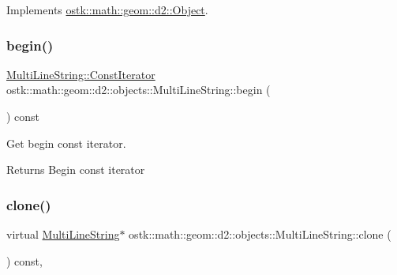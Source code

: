 Implements \hyperlink{classostk_1_1math_1_1geom_1_1d2_1_1_object_a959e50211d7a680f7f904bbb752d75c9}{ostk\+::math\+::geom\+::d2\+::\+Object}.

\mbox{\label{classostk_1_1math_1_1geom_1_1d2_1_1objects_1_1_multi_line_string_a9789bc63ef669a8f625da8f617a605a6}} 
\subsubsection{\texorpdfstring{begin()}{begin()}}
{\footnotesize\ttfamily \hyperlink{classostk_1_1math_1_1geom_1_1d2_1_1objects_1_1_multi_line_string_a43dc9419e5743d8a920141ba4fa10c5f}{Multi\+Line\+String\+::\+Const\+Iterator} ostk\+::math\+::geom\+::d2\+::objects\+::\+Multi\+Line\+String\+::begin (\begin{DoxyParamCaption}{ }\end{DoxyParamCaption}) const}



Get begin const iterator. 

\begin{DoxyReturn}{Returns}
Begin const iterator 
\end{DoxyReturn}
\mbox{\label{classostk_1_1math_1_1geom_1_1d2_1_1objects_1_1_multi_line_string_abf1b39f7e7f9c1f1ba9b040669863e81}} 
\subsubsection{\texorpdfstring{clone()}{clone()}}
{\footnotesize\ttfamily virtual \hyperlink{classostk_1_1math_1_1geom_1_1d2_1_1objects_1_1_multi_line_string}{Multi\+Line\+String}$\ast$ ostk\+::math\+::geom\+::d2\+::objects\+::\+Multi\+Line\+String\+::clone (\begin{DoxyParamCaption}{ }\end{DoxyParamCaption}) const\hspace{0.3cm}{\ttfamily [override]}, {\ttfamily [virtual]}}



